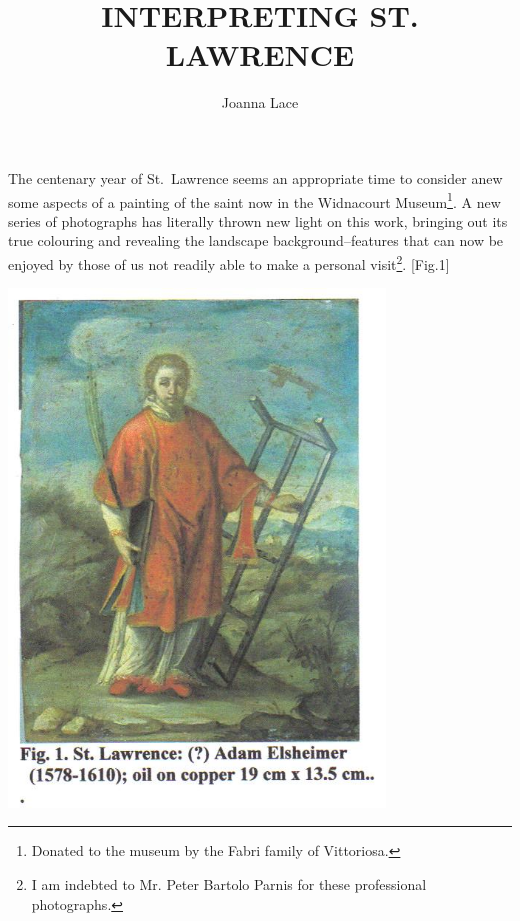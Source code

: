 \documentclass[a4paper,12pt]{article}
\begin{document}
\title{INTERPRETING ST. LAWRENCE}
\author{Joanna Lace}
\date{}
\maketitle


The centenary year of St.~Lawrence seems an appropriate time to
consider anew some aspects of a painting of the saint now in the
Widnacourt Museum\footnote{Donated to the museum by the Fabri family
  of Vittoriosa.}. A new series of photographs has literally thrown
new light on this work, bringing out its true colouring and revealing
the landscape background--features that can now be enjoyed by those of
us not readily able to make a personal visit\footnote{I am indebted to
  Mr. Peter Bartolo Parnis for these professional
  photographs.}. [Fig.1]
\begin{center}
\includegraphics[width=10cm]{fig1.jpg}
\end{center}
\end{document}
